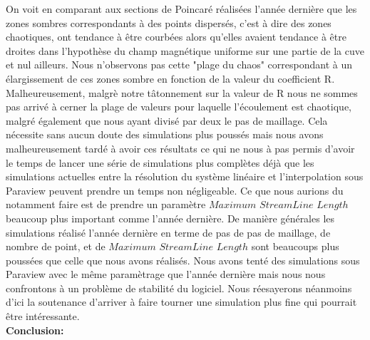\documentclass[a4paper,12pt,titlepage]{report}
\begin{document}
\begin{onehalfspace}
On voit en comparant aux sections de Poincaré réalisées l'année dernière que les zones sombres correspondants à des points dispersés, c'est à dire des zones chaotiques, ont tendance à être courbées alors qu'elles avaient tendance à être droites dans l'hypothèse du champ magnétique uniforme sur une partie de la cuve et nul ailleurs.
Nous n'observons pas cette "plage du chaos" correspondant à un élargissement de ces zones sombre en fonction de la valeur du coefficient R.
Malheureusement, malgrè notre tâtonnement sur la valeur de R nous ne sommes pas arrivé à cerner la plage de valeurs pour laquelle l'écoulement est chaotique, malgré également que nous ayant divisé par deux le pas de maillage. Cela nécessite sans aucun doute des simulations plus poussés mais nous avons malheureusement tardé à avoir ces résultats ce qui ne nous à pas permis d'avoir le temps de lancer une série de simulations plus complètes déjà que les simulations actuelles entre la résolution du système linéaire et l'interpolation sous Paraview peuvent prendre un temps non négligeable. Ce que nous aurions du notamment faire est de prendre un paramètre $Maximum$ $StreamLine$ $Length$ beaucoup plus important comme l'année dernière. De manière générales les simulations réalisé l'année dernière en terme de pas de pas de maillage, de nombre de point, et de $Maximum$ $StreamLine$ $Length$ sont beaucoups plus poussées que celle que nous avons réalisés. Nous avons tenté des simulations sous Paraview avec le même paramètrage que l'année dernière mais nous nous confrontons à un problème de stabilité du logiciel.
Nous réesayerons néanmoins d'ici la soutenance d'arriver à faire tourner une simulation plus fine qui pourrait être intéressante.\\
\newpage
\newpage
\textbf{\Huge Conclusion:}
\normalsize
\\


\end{onehalfspace}
\end{document}
